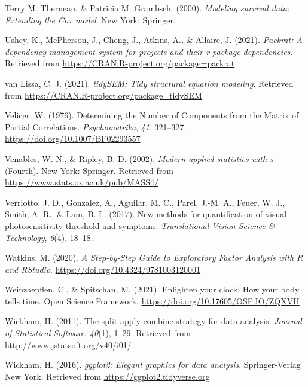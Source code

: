 \documentclass[
  english,
  man]{apa6}
\newlength{\cslhangindent}
\newlength{\cslentryspacingunit} %
\newenvironment{CSLReferences}[2] %
 {%
  \setlength{\parindent}{0pt}
  \ifodd #1
  \let\oldpar\par
  \def\par{\hangindent=\cslhangindent\oldpar}
  \fi
  \setlength{\parskip}{#2\cslentryspacingunit}
 }%
 {}
\begin{document}
\begin{CSLReferences}{1}{0}
\leavevmode{}%
Terry M. Therneau, \& Patricia M. Grambsch. (2000). \emph{Modeling survival data: Extending the {C}ox model}. New York: Springer.

\leavevmode{}%
Ushey, K., McPherson, J., Cheng, J., Atkins, A., \& Allaire, J. (2021). \emph{Packrat: A dependency management system for projects and their r package dependencies}. Retrieved from \url{https://CRAN.R-project.org/package=packrat}

\leavevmode{}%
van Lissa, C. J. (2021). \emph{tidySEM: Tidy structural equation modeling}. Retrieved from \url{https://CRAN.R-project.org/package=tidySEM}

\leavevmode{}%
Velicer, W. (1976). Determining the {Number} of {Components} from the {Matrix} of {Partial Correlations}. \emph{Psychometrika}, \emph{41}, 321--327. \url{https://doi.org/10.1007/BF02293557}

\leavevmode{}%
Venables, W. N., \& Ripley, B. D. (2002). \emph{Modern applied statistics with s} (Fourth). New York: Springer. Retrieved from \url{https://www.stats.ox.ac.uk/pub/MASS4/}

\leavevmode{}%
Verriotto, J. D., Gonzalez, A., Aguilar, M. C., Parel, J.-M. A., Feuer, W. J., Smith, A. R., \& Lam, B. L. (2017). New methods for quantification of visual photosensitivity threshold and symptoms. \emph{Translational Vision Science \& Technology}, \emph{6}(4), 18--18.

\leavevmode{}%
Watkins, M. (2020). \emph{A {Step}-by-{Step Guide} to {Exploratory Factor Analysis} with {R} and {RStudio}}. \url{https://doi.org/10.4324/9781003120001}

\leavevmode{}%
Weinzaepflen, C., \& Spitschan, M. (2021). Enlighten your clock: How your body tells time. {Open Science Framework}. \url{https://doi.org/10.17605/OSF.IO/ZQXVH}

\leavevmode{}%
Wickham, H. (2011). The split-apply-combine strategy for data analysis. \emph{Journal of Statistical Software}, \emph{40}(1), 1--29. Retrieved from \url{http://www.jstatsoft.org/v40/i01/}

\leavevmode{}%
Wickham, H. (2016). \emph{ggplot2: Elegant graphics for data analysis}. Springer-Verlag New York. Retrieved from \url{https://ggplot2.tidyverse.org}


\end{CSLReferences}
\end{document}
